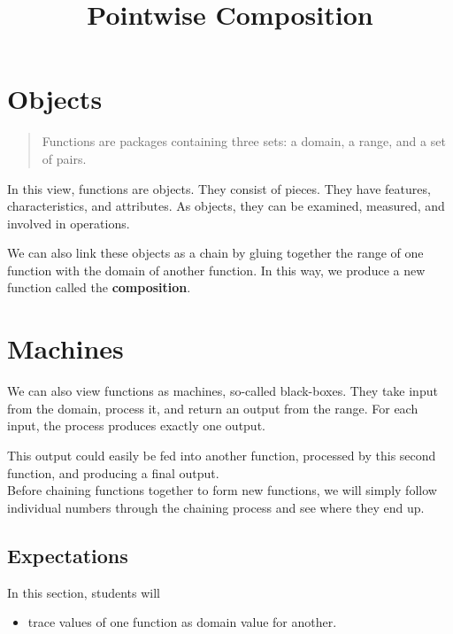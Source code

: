 \documentclass{ximera}
\title{Pointwise Composition}
\begin{document}
\begin{abstract}
\end{abstract}
\maketitle



\section{Objects}


\begin{quote}
Functions are packages containing three sets: a domain, a range, and a set of pairs.
\end{quote}

In this view, functions are objects.  They consist of pieces. They have features, characteristics, and attributes.  As objects, they can be examined, measured, and involved in operations.


We can also link these objects as a chain by gluing together the range of one function with the domain of another function.  In this way, we produce a new function called the \textbf{composition}.












\section{Machines}



We can also view functions as machines, so-called black-boxes.  They take input from the domain, process it, and return an output from the range.  For each input, the process produces exactly one output.



This output could easily be fed into another function, processed by this second function, and producing a final output. \\



Before chaining functions together to form new functions, we will simply follow individual numbers through the chaining process and see where they end up.















\subsection{Expectations}


\begin{sectionOutcomes}
In this section, students will 

\begin{itemize}
\item trace values of one function as domain value for another.

\end{itemize}
\end{sectionOutcomes}
\end{document}
